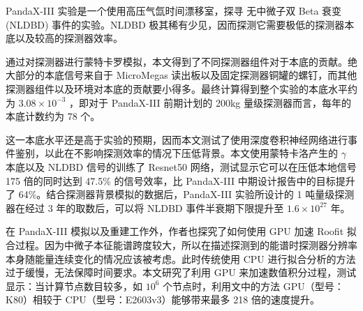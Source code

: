 
\pkuthssffaq %

PandaX-III 实验是一个使用高压气氙时间漂移室，探寻 \xeots 无中微子双 Beta 衰变 (NLDBD) 事件的实验。NLDBD 极其稀有少见，因而探测它需要极低的探测器本底以及较高的探测器效率。

通过对探测器进行蒙特卡罗模拟，本文得到了不同探测器组件对于本底的贡献。绝大部分的本底信号来自于 MicroMegas 读出板以及固定探测器铜罐的螺钉，而其他探测器组件以及环境对本底的贡献要小得多。最终计算得到整个实验的本底水平约为 $3.08\times 10^{-3}$ \ckky，即对于 PandaX-III 前期计划的 200kg 量级探测器而言，每年的本底计数约为 78 个。

这一本底水平还是高于实验的预期，因而本文测试了使用深度卷积神经网络进行事件鉴别，以此在不影响探测效率的情况下压低背景。本文使用蒙特卡洛产生的 $\gamma$ 本底以及 NLDBD 信号的训练了 Resnet50 网络，测试显示它可以在压低本地信号 175 倍的同时达到 47.5\% 的信号效率，比 PandaX-III 中期设计报告中的目标提升了 64\%。结合探测器背景模拟的数据后，PandaX-III 实验所设计的 1 吨量级探测器在经过 3 年的取数后，可以将 \xeots NLDBD 事件半衰期下限提升至 $1.6\times10^{27}$ 年。

在 PandaX-III 模拟以及重建工作外，作者也探究了如何使用 GPU 加速 Roofit 拟合过程。因为中微子本征能谱跨度较大，所以在描述探测到的能谱时探测器分辨率本身随能量连续变化的情况应该被考虑。此时传统使用 CPU 进行拟合分析的方法过于缓慢，无法保障时间要求。本文研究了利用 GPU 来加速数值积分过程，测试显示：当计算节点数目较多，如 $10^{6}$ 个节点时，利用文中的方法 GPU（型号：K80）相较于 CPU（型号：E2603v3）能够带来最多 218 倍的速度提升。


